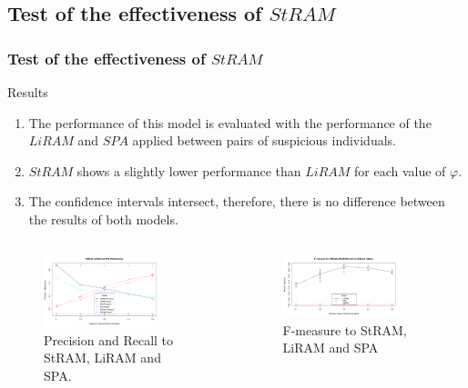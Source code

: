 \documentclass[aspectratio=169]{beamer}
\begin{document}
\subsection[Test of the effectiveness of $StRAM$]{Test of the effectiveness of $StRAM$}
\begin{frame}
\frametitle{Test of the effectiveness of $StRAM$}
\begin{block}{Results}
  \footnotesize
  \begin{enumerate}
    \item The performance of this model is evaluated with the performance of the $LiRAM$\cite{Troncoso201} and $SPA$\cite{xu204} applied between pairs of suspicious individuals.
    \item $StRAM$ shows a slightly lower performance than $LiRAM$ for each value of $\varphi$.
    \item The confidence intervals intersect, therefore, there is no difference between the results of both models.
  \end{enumerate}
\end{block}
\begin{columns}
  \begin{figure}[ht]
    \centering
    \includegraphics[width=0.8\textwidth]{images/comparation.pdf}
    \caption{\footnotesize Precision and Recall to StRAM, LiRAM and SPA.}
  \end{figure}
  \begin{figure}[ht]
    \centering
    \includegraphics[width=0.8\textwidth]{images/confidence-interval.pdf}
    \caption{\footnotesize F-measure to StRAM, LiRAM and SPA}
  \end{figure}
\end{columns}
\end{frame}
\end{document}
